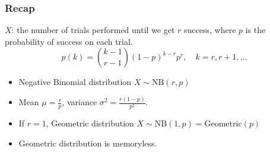 \documentclass[slidestop,compress,mathserif]{beamer}
\begin{document}


\begin{frame}\frametitle{Recap}

$X$: the number of trials performed until we get $r$ success, where $p$ is the probability of success on each trial.
\[ p(k) = {k - 1 \choose r - 1}(1-p)^{k-r}p^{r},\quad k = r, r+1, \ldots \]
\vspace{-0.5cm}
\begin{itemize}
\item Negative Binomial distribution $X \sim \text{NB}(r, p)$
\item Mean $\mu = \frac{r}{p}$, variance $\sigma^2 = \frac{r(1-p)}{p^2}$.
\item If $r = 1$, Geometric distribution $X \sim \text{NB}(1, p) = \text{Geometric}(p)$
\item Geometric distribution is memoryless.
\end{itemize}



\end{frame}
\end{document}
